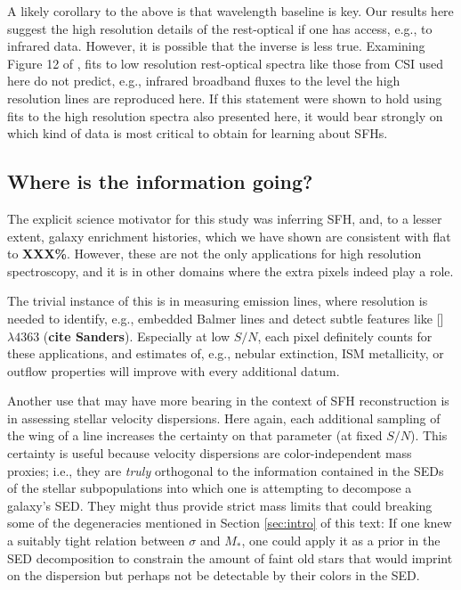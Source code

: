\documentclass[a4paper,fleqn,usenatbib]{mnras}
\newcommand{\Mstel}{M_\ast}
\newcommand{\bfr}{\bf\color{red}}
\begin{document}
A likely corollary to the above is that wavelength baseline is key. Our results here suggest
the high resolution details of the rest-optical if one has access, e.g., to infrared data. However,
it is possible that the inverse is less true. Examining Figure 12 of \citet{Abramson20}, fits to
low resolution rest-optical spectra like those from CSI used here do not predict, e.g., infrared
broadband fluxes to the level the high resolution lines are reproduced here. If this statement
were shown to hold using fits to the high resolution spectra also presented here, it would bear
strongly on which kind of data is most critical to obtain for learning about SFHs. 

\subsection{Where is the information going?}
\label{sec:redshifts}

The explicit science motivator for this study was inferring SFH, and, to a lesser extent, galaxy 
enrichment histories, which we have shown are consistent with flat to {\bfr XXX\%}. However, 
these are not the only applications for high resolution spectroscopy, and it is in other domains 
where the extra pixels indeed play a role.

The trivial instance of this is in measuring emission lines, where resolution is needed to 
identify, e.g., embedded Balmer lines and detect subtle features like [] 
$\lambda4363$ ({\bfr cite Sanders}). Especially at low $S/N$, each pixel definitely counts
for these applications, and estimates of, e.g., nebular extinction, ISM metallicity, or outflow
properties will improve with every additional datum.

Another use that may have more bearing in the context of SFH reconstruction is in assessing
stellar velocity dispersions. Here again, each additional sampling of the wing of a line increases
the certainty on that parameter (at fixed $S/N$). This certainty is useful because velocity dispersions 
are color-independent mass proxies; i.e., they are {\it truly} orthogonal to the information contained 
in the SEDs of the stellar subpopulations into which one is attempting to decompose a galaxy's SED.
They might thus provide strict mass limits that could breaking some of the degeneracies mentioned
in Section \ref{sec:intro} of this text: If one knew a suitably tight relation between $\sigma$
and $\Mstel$, one could apply it as a prior in the SED decomposition to constrain the
amount of faint old stars that would imprint on the dispersion but perhaps not be detectable
by their colors in the SED.
\end{document}

